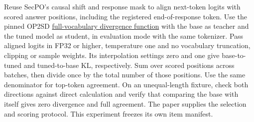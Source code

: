 \documentclass[11pt]{article}
\begin{document}
Reuse SecPO's causal shift and response mask to align next-token logits with scored answer positions, including the registered end-of-response token. Use the pinned OP2SD \href{https://github.com/MBZUAI-reasoninglab/OP2SD/blob/dee6efb2169dfff9b068ea8cda6268182af22a2b/src/opsd_trainer.py#L1226-L1340}{full-vocabulary divergence function} with the base as teacher and the tuned model as student, in evaluation mode with the same tokenizer. Pass aligned logits in FP32 or higher, temperature one and no vocabulary truncation, clipping or sample weights. Its interpolation settings zero and one give base-to-tuned and tuned-to-base KL, respectively. Sum over scored positions across batches, then divide once by the total number of those positions. Use the same denominator for top-token agreement. On an unequal-length fixture, check both directions against direct calculation and verify that comparing the base with itself gives zero divergence and full agreement. The paper supplies the selection and scoring protocol. This experiment freezes its own item manifest.
\end{document}
